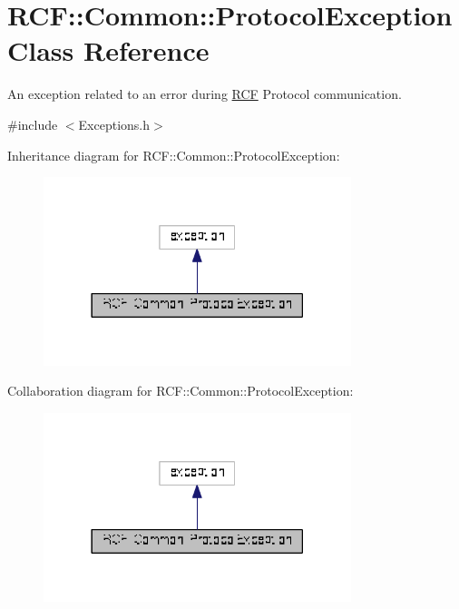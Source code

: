 \hypertarget{class_r_c_f_1_1_common_1_1_protocol_exception}{}\section{R\+C\+F\+:\+:Common\+:\+:Protocol\+Exception Class Reference}
\label{class_r_c_f_1_1_common_1_1_protocol_exception}


An exception related to an error during \hyperlink{namespace_r_c_f}{R\+C\+F} Protocol communication.  




{\ttfamily \#include $<$Exceptions.\+h$>$}



Inheritance diagram for R\+C\+F\+:\+:Common\+:\+:Protocol\+Exception\+:\nopagebreak
\begin{figure}[H]
\begin{center}
\leavevmode
\includegraphics[width=254pt]{class_r_c_f_1_1_common_1_1_protocol_exception__inherit__graph}
\end{center}
\end{figure}


Collaboration diagram for R\+C\+F\+:\+:Common\+:\+:Protocol\+Exception\+:\nopagebreak
\begin{figure}[H]
\begin{center}
\leavevmode
\includegraphics[width=254pt]{class_r_c_f_1_1_common_1_1_protocol_exception__coll__graph}
\end{center}
\end{figure}
